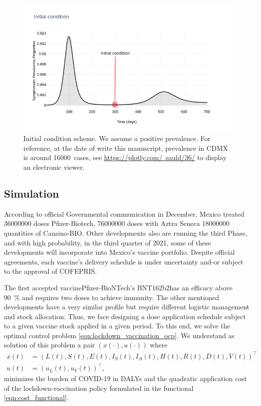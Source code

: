 \begin{figure}
    \centering
    \includegraphics[scale=0.5, keepaspectratio]{figs/InitialCondition}
    \caption[Initial condition]{
        Initial condition scheme. We assume a positive prevalence. 
        For reference, at the date of write this manuscript, prevalence in CDMX 
        is around \SI{16000}{cases}, see
        \href{https://plotly.com/~sauld/36/}{https://plotly.com/~sauld/36/}
        to display an electronic viewer.}
        \label{fig:initialcondition}
\end{figure}
\subsection{Simulation}
 According to official Governmental communication in December, Mexico treated  
\num{36000000} doses  Pfizer-Biotech, \num{76000000} doses with Aztra Seneca 
\num{18000000} quantities of Cansino-BIO. Other developments 
also are running the third Phase, and with high probability,  in the third
quarter of 2021, some of these developments will incorporate into Mexico's 
vaccine portfolio. Despite official agreements, each vaccine's delivery schedule 
is under uncertainty and-or subject to the approval of COFEPRIS.

The first accepted vaccine\textemdash Pfizer-BioNTech's BNT162b2\textemdash has 
an efficacy above \SI{90}{\percent} and requires two doses to achieve immunity. 
The other mentioned developments have a very similar profile but require 
different logistic management and stock allocation.
Thus, we face designing a dose application schedule subject to a given vaccine 
stock applied in a given period. To this end, we solve the optimal control 
problem \eqref{eqn:lockdown_vaccination_ocp}. 
We understand as solution of this problem a pair $(x(\cdot), u(\cdot))$ where
\begin{equation}
    \begin{aligned}
        x(t) &= 
            (L(t), S(t), E(t), I_S(t), I_A(t), H(t), R(t), D(t), V(t))^{\top}
        \\
        u(t) &= (u_L(t), u_V(t)) ^ {\top},
    \end{aligned}
\end{equation}
minimizes the burden of COVID-19 in DALYs \cite{WhoDALY} and the quadratic 
application cost of the lockdown-vaccination policy formulated in the functional 
\eqref{eqn:cost_functional}.  


